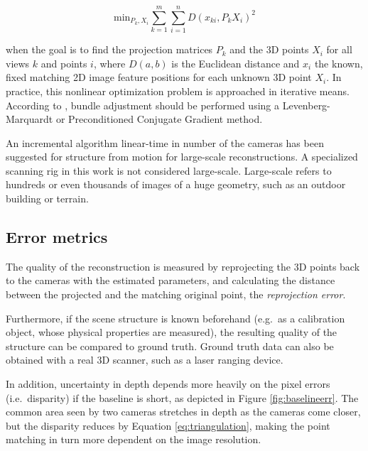 \begin{equation}
	\text{min}_{P_k, X_i} \sum_{k=1}^m \sum_{i=1}^n D(x_{ki}, P_k X_i)^2
\end{equation}

when the goal is to find the projection matrices $P_k$ and the 3D points $X_i$ for all views $k$ and points $i$, where $D(a,b)$ is the Euclidean distance and $x_i$ the known, fixed matching 2D image feature positions for each unknown 3D point $X_i$.
In practice, this nonlinear optimization problem is approached in iterative means.
According to \cite{wu2013towards}, bundle adjustment should be performed using a Levenberg-Marquardt or Preconditioned Conjugate Gradient method.

An incremental algorithm linear-time in number of the cameras has been suggested for structure from motion for large-scale reconstructions. \cite{wu2013towards}
A specialized scanning rig in this work is not considered large-scale.
Large-scale refers to hundreds or even thousands of images of a huge geometry, such as an outdoor building or terrain.


\subsection{Error metrics} %

The quality of the reconstruction is measured by reprojecting the 3D points back to the cameras with the estimated parameters, and calculating the distance between the projected and the matching original point, the \emph{reprojection error}. \cite{hartley03multiview}

Furthermore, if the scene structure is known beforehand (e.g.\ as a calibration object, whose physical properties are measured), the resulting quality of the structure can be compared to ground truth.
Ground truth data can also be obtained with a real 3D scanner, such as a laser ranging device. %

In addition, uncertainty in depth depends more heavily on the pixel errors (i.e.\ disparity) if the baseline is short, as depicted in Figure \ref{fig:baselineerr}. %
The common area seen by two cameras stretches in depth as the cameras come closer, but the disparity reduces by Equation \ref{eq:triangulation}, making the point matching in turn more dependent on the image resolution.

